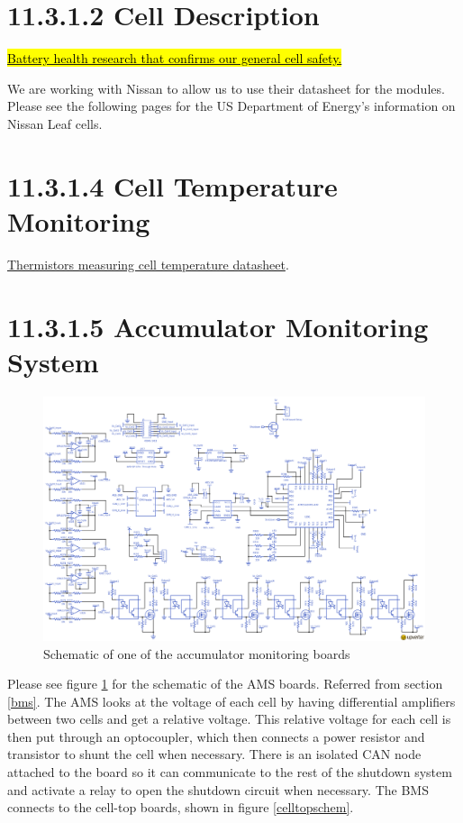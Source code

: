 \documentclass{article}
\DeclareRobustCommand{\hlr}[1]{{\sethlcolor{red}\hl{#1}}}
\begin{document}
\section*{11.3.1.2 Cell Description}
\href{http://batteryuniversity.com/learn/article/discharge_methods}{\hlr{Battery health research that confirms our general cell safety.}}

We are working with Nissan to allow us to use their datasheet for the modules. Please see the following pages for the US Department of Energy's information on Nissan Leaf cells.



\section*{11.3.1.4 Cell Temperature Monitoring}

\href{http://media.digikey.com/PDF/Data\%20Sheets/Ametherm\%20PDFs/PANR\%20103395-408.pdf}{Thermistors measuring cell temperature datasheet}.

\section*{11.3.1.5 Accumulator Monitoring System}  \label{amsappendix}

\begin{figure}
    \centering
    \includegraphics[width = 1 \textwidth]{BMS_Schem}
    \caption{Schematic of one of the accumulator monitoring boards}
    \label{amsschem}
\end{figure}

Please see figure \ref{amsschem} for the schematic of the AMS boards. Referred from section \ref{bms}. The AMS looks at the voltage of each cell by having differential amplifiers between two cells and get a relative voltage. This relative voltage for each cell is then put through an optocoupler, which then connects a power resistor and transistor to shunt the cell when necessary. There is an isolated CAN node attached to the board so it can communicate to the rest of the shutdown system and activate a relay to open the shutdown circuit when necessary. The BMS connects to the cell-top boards, shown in figure \ref{celltopschem}.
\end{document}
